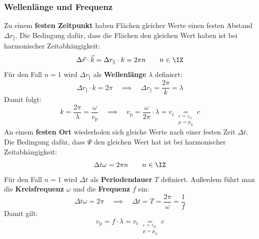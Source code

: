   \subsubsection{Wellenlänge und Frequenz}
	 	 Zu einem \textbf{festen Zeitpunkt} haben Flächen gleicher Werte einen festen Abstand $\Delta r_\Vert$. Die Bedingung dafür, dass die Flächen den gleichen Wert haben ist bei harmonischer Zeitabhängigkeit:
	 	 \begin{equation}
	 	 	\Delta\vec{r} \cdot\vec{k} = \Delta r_\Vert \cdot  k  = 2\pi n \quad \quad n\in\IZ  
	 	 \end{equation}
	 	 Für den Fall $n=1$ wird $\Delta r_\Vert$ als \textbf{Wellenlänge} $\lambda$ definiert:
	 	 \begin{equation}
	 	 	\Delta r_\Vert \cdot  k  = 2\pi                           \quad\implies\quad \boxed{\Delta r_\Vert = \frac{2\pi}{ k} =\lambda}
	 	 \end{equation}
	 	 Damit folgt:
 		        \begin{equation}
			      k = \frac{2\pi}{\lambda}   = \frac{\omega}{ v_{\mathrm{p}}} \quad \implies \quad \boxed{ v_{\mathrm{p}}=\frac{\omega}{2\pi}\cdot \lambda}  =  v_\mathrm{c} \underset{\substack{\varepsilon = \varepsilon_0 \\ \mu = \mu_0}}{=} c
		        \end{equation}
		  An einem \textbf{festen Ort} wiederholen sich gleiche Werte nach einer festen Zeit $\Delta t$. Die Bedingung dafür, dass $\Psi$ den gleichen Wert hat ist bei harmonischer Zeitabhängigkeit:
		  \begin{equation}
		  	 \Delta t \omega     = 2\pi  n     \quad \quad n\in \IZ                              
		  \end{equation}
		  Für den Fall $n=1$ wird $\Delta t$ als \textbf{Periodendauer} $T$ definiert. Außerdem führt man die \textbf{Kreisfrequenz} $\omega$ und die \textbf{Frequenz} $f$ ein: 
		  \begin{equation}
		  	\Delta t \omega = 2\pi \quad\implies\quad \boxed{\Delta t = T  = \frac{2\pi}{\omega} = \frac{1}{f}}
		  \end{equation}
		  Damit gilt:
		        \begin{equation}
			     \boxed{ v_{\mathrm{p}}= f \cdot \lambda}  =  v_\mathrm{c}\underset{\substack{\varepsilon = \varepsilon_0                                            \\ \mu = \mu_0}}{=} c
		        \end{equation}
